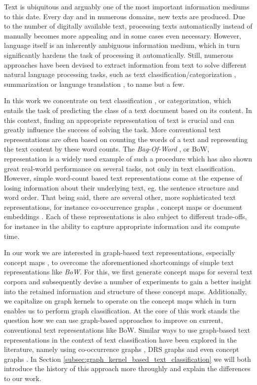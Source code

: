 Text is ubiquitous and arguably one of the most important information mediums to this date.
Every day and in numerous domains, new texts are produced.
Due to the number of digitally available text, processing texts automatically instead of manually becomes more appealing and in some cases even necessary.
However, language itself is an inherently ambiguous information medium, which in turn significantly hardens the task of processing it automatically.
Still, numerous approaches have been devised to extract information from text to solve different natural language processing tasks, such as text classification/categorization \cite[p.~575]{Manning2000}, summarization \cite{Mani1999} or language translation \cite{Weaver1955}, to name but a few.

In this work we concentrate on text classification \cite[p.~232]{Manning2000}, or categorization, which entails the task of predicting the class of a text document based on its content.
In this context, finding an appropriate representation of text is crucial and can greatly influence the success of solving the task.
More conventional text representations are often based on counting the words of a text and representing the text content by these word counts.
The \textit{Bag-Of-Word} \cite[p.~237]{Manning2000}, or BoW, representation is a widely used example of such a procedure which has also shown great real-world performance on several tasks, not only in text classification.
However, simple word-count based text representations come at the expense of losing information about their underlying text, eg. the sentence structure and word order.
That being said, there are several other, more sophisticated text representations, for instance co-occurrence graphs \cite{Rousseau2013}, concept maps \cite{Novak2008,Falke2017b} or document embeddings \cite{Dai2015,Lau2016}.
Each of these representations is also subject to different trade-offs, for instance in the ability to capture appropriate information and its compute time.

In our work we are interested in graph-based text representations, especially concept maps \cite{Novak2008,Falke2017b}, to overcome the aforementioned shortcomings of simple text representations like \textit{BoW}.
For this, we first generate concept maps for several text corpora and subsequently devise a number of experiments to gain a better insight into the retained information and structure of these concept maps.
Additionally, we capitalize on graph kernels \cite{Kulharia2008} to operate on the concept maps which in turn enables us to perform graph classification.
At the core of this work stands the question how we can use graph-based approaches to improve on current, conventional text representations like BoW.
Similar ways to use graph-based text representations in the context of text classification have been explored in the literature, namely using co-occurrence graphs \cite{Rousseau2015a, Nikolentzos2017b}, DRS graphs \cite{Gaspar2011} and even concept graphs \cite{Gulrandhe2015}.
In Section \ref{subsec:graph_kernel_based_text_classification} we will both introduce the history of this approach more throughly and explain the differences to our work.

